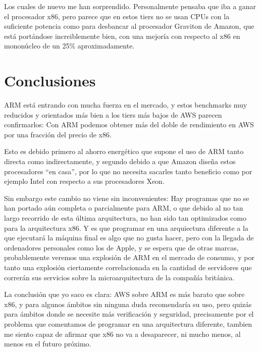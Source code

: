 \documentclass[a4paper,openright,12pt]{article}
\begin{document}
Los cuales de nuevo me han sorprendido. Personalmente pensaba que iba a ganar el procesador x86, pero parece que en estos tiers no se usan CPUs con la suficiente potencia como para
desbancar al procesador Graviton de Amazon, que está portándose increiblemente bien, con una mejoría con respecto al x86 en mononúcleo de un 25\% aproximadamente.


\newpage
\section{Conclusiones}
ARM está entrando con mucha fuerza en el mercado, y estos benchmarks muy reducidos y orientados más bien a los tiers más bajos de AWS parecen confirmarlos: Con ARM podemos obtener más del
doble de rendimiento en AWS por una fracción del precio de x86.

Esto es debido primero al ahorro energético que supone el uso de ARM tanto directa como indirectamente, y segundo debido a que Amazon diseña estos procesadores ``en casa'', por lo que no
necesita sacarles tanto beneficio como por ejemplo Intel con respecto a sus procesadores Xeon.

Sin embargo este cambio no viene sin inconvenientes: Hay programas que no se han portado aún completa o parcialmente para ARM, o que debido al no tan largo recorrido de esta última
arquitectura, no han sido tan optimizados como para la arquitectura x86.
Y es que programar en una arquiectura diferente a la que ejecutará la máquina final es algo que no gusta hacer, pero con la llegada de ordenadores personales como los de Apple, y se espera
que de otras marcas, probablemente veremos una explosión de ARM en el mercado de consumo, y por tanto una explosión ciertamente correlacionada en la cantidad de servidores que correrán
sus servicios sobre la microarquitectura de la compañía británica.

\bigskip

La conclusión que yo saco es clara: AWS sobre ARM es más barato que sobre x86, y para algunos ámbitos sin ninguna duda recomendaría su uso, pero quizás para ámbitos donde se necesite más
verificación y seguridad, precisamente por el problema que comentamos de programar en una arquitectura diferente, tambien me siento capaz de afirmar que x86 no va a desaparecer, ni mucho
menos, al menos en el futuro próximo.
\end{document}
